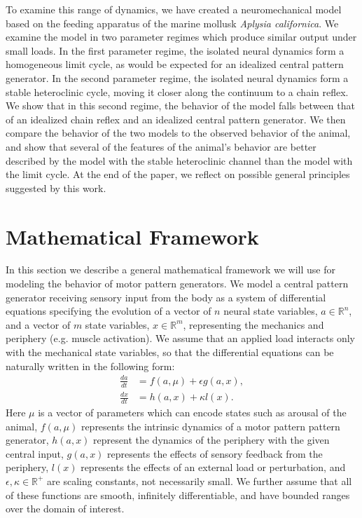 To examine this range of dynamics, we have created a neuromechanical model
based on the feeding apparatus of the marine mollusk \textit{Aplysia
californica}.  We examine the model in two parameter regimes which produce
similar output under small loads.  In the first parameter regime, the isolated
neural dynamics form a homogeneous limit cycle, as would be expected for an
idealized central pattern generator.  In the second parameter regime, the
isolated neural dynamics form a stable heteroclinic cycle, moving it closer
along the continuum to a chain reflex.  We show that in
this second regime, the behavior of the model falls between that of an
idealized chain reflex and an idealized central pattern generator.  We then
compare the behavior of the two models to the observed behavior of the animal,
and show that several of the features of the animal's behavior are better
described by the model with the stable heteroclinic channel than the
model with the limit cycle.  At the end of the paper, we reflect on
possible general principles suggested by this work.

\section{Mathematical Framework}
\label{sec:mathematical_framework}

In this section we describe a general mathematical framework we will use for
modeling the behavior of motor pattern generators.  We model a central pattern
generator receiving sensory input from the body as a system of
differential equations specifying the evolution of a vector of $n$ neural state
variables, $a \in \mathbb{R}^n$, and a vector of $m$ state variables, $x \in
\mathbb{R}^m$, representing the mechanics and periphery (e.g. muscle
activation).  We assume that an applied load interacts only with the
mechanical state variables, so that the differential equations can be
naturally written in the following form:
\begin{align}
    \frac{da}{dt} &= f(a, \mu) + \epsilon g(a, x),\label{eq:generic_a}\\
    \frac{dx}{dt} &= h(a, x) + \kappa l(x).\label{eq:generic_x}
\end{align}
Here $\mu$ is a vector of parameters which can encode states such as arousal
of the animal, $f(a, \mu)$ represents the intrinsic dynamics of a motor
pattern pattern generator, $h(a, x)$ represent the dynamics of the periphery
with the given central input, $g(a, x)$ represents the effects of sensory
feedback from the periphery, $l(x)$ represents the effects of an external
load or perturbation, and $\epsilon, \kappa \in \mathbb{R}^+$ are scaling
constants, not necessarily small.  We further assume that all of these
functions are smooth, infinitely differentiable, and have bounded ranges over
the domain of interest.

